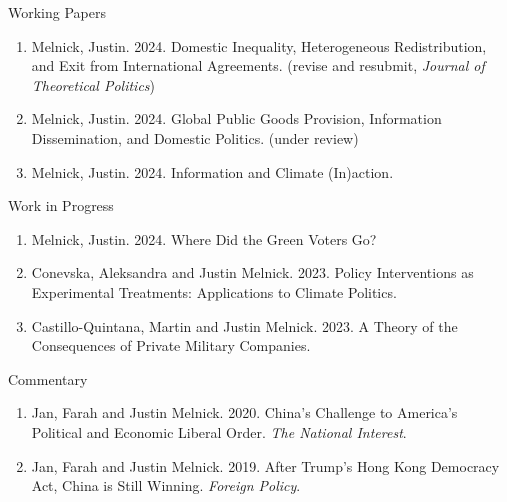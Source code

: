 \documentclass{resume} %
\begin{document}
\begin{rSection}{Working Papers}

\begin{enumerate}
            \item Melnick, Justin. 2024. Domestic Inequality, Heterogeneous Redistribution, and Exit from International Agreements. (revise and resubmit, \textit{Journal of Theoretical Politics})
                \item Melnick, Justin. 2024. Global Public Goods Provision, Information Dissemination, and Domestic Politics. (under review)
                    \item Melnick, Justin. 2024. Information and Climate (In)action.
\end{enumerate}

\end{rSection}

\begin{rSection}{Work in Progress}

\begin{enumerate}
    \item Melnick, Justin. 2024. Where Did the Green Voters Go?
    \item Conevska, Aleksandra and Justin Melnick. 2023. Policy Interventions as Experimental Treatments: Applications to Climate Politics.
    \item Castillo-Quintana, Martin and Justin Melnick. 2023. A Theory of the Consequences of Private Military Companies.
\end{enumerate}

\end{rSection}

\begin{rSection}{Commentary}
    \begin{enumerate}
    \item   Jan, Farah and Justin Melnick. 2020. China's Challenge to America's Political and Economic Liberal Order. \textit{The National Interest}.
    \item    Jan, Farah and Justin Melnick. 2019. After Trump's Hong Kong Democracy Act, China is Still Winning. \textit{Foreign Policy}.
\end{enumerate}
\end{rSection}

\newpage
\end{document}
